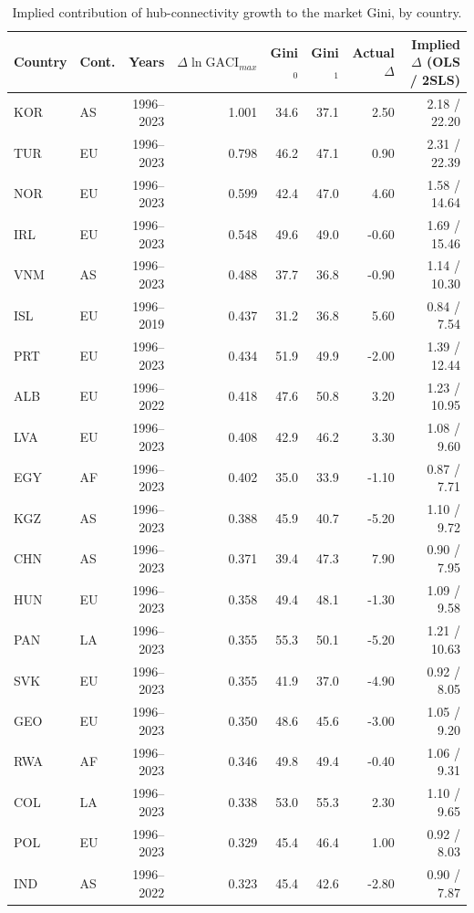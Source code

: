 \begin{table}[H]\centering\caption{Implied contribution of hub-connectivity growth to the market Gini, by country.}\label{tab:a_country}
\begin{threeparttable}\scriptsize\begin{tabular}{llrrrrrr}
\toprule
Country & Cont. & Years & $\Delta\ln\mathrm{GACI}_{max}$ & Gini$_0$ & Gini$_1$ & Actual $\Delta$ & Implied $\Delta$ (OLS / 2SLS) \\
\midrule
KOR & AS & 1996--2023 & 1.001 & 34.6 & 37.1 & 2.50 & 2.18 / 22.20 \\
TUR & EU & 1996--2023 & 0.798 & 46.2 & 47.1 & 0.90 & 2.31 / 22.39 \\
NOR & EU & 1996--2023 & 0.599 & 42.4 & 47.0 & 4.60 & 1.58 / 14.64 \\
IRL & EU & 1996--2023 & 0.548 & 49.6 & 49.0 & -0.60 & 1.69 / 15.46 \\
VNM & AS & 1996--2023 & 0.488 & 37.7 & 36.8 & -0.90 & 1.14 / 10.30 \\
ISL & EU & 1996--2019 & 0.437 & 31.2 & 36.8 & 5.60 & 0.84 / 7.54 \\
PRT & EU & 1996--2023 & 0.434 & 51.9 & 49.9 & -2.00 & 1.39 / 12.44 \\
ALB & EU & 1996--2022 & 0.418 & 47.6 & 50.8 & 3.20 & 1.23 / 10.95 \\
LVA & EU & 1996--2023 & 0.408 & 42.9 & 46.2 & 3.30 & 1.08 / 9.60 \\
EGY & AF & 1996--2023 & 0.402 & 35.0 & 33.9 & -1.10 & 0.87 / 7.71 \\
KGZ & AS & 1996--2023 & 0.388 & 45.9 & 40.7 & -5.20 & 1.10 / 9.72 \\
CHN & AS & 1996--2023 & 0.371 & 39.4 & 47.3 & 7.90 & 0.90 / 7.95 \\
HUN & EU & 1996--2023 & 0.358 & 49.4 & 48.1 & -1.30 & 1.09 / 9.58 \\
PAN & LA & 1996--2023 & 0.355 & 55.3 & 50.1 & -5.20 & 1.21 / 10.63 \\
SVK & EU & 1996--2023 & 0.355 & 41.9 & 37.0 & -4.90 & 0.92 / 8.05 \\
GEO & EU & 1996--2023 & 0.350 & 48.6 & 45.6 & -3.00 & 1.05 / 9.20 \\
RWA & AF & 1996--2023 & 0.346 & 49.8 & 49.4 & -0.40 & 1.06 / 9.31 \\
COL & LA & 1996--2023 & 0.338 & 53.0 & 55.3 & 2.30 & 1.10 / 9.65 \\
POL & EU & 1996--2023 & 0.329 & 45.4 & 46.4 & 1.00 & 0.92 / 8.03 \\
IND & AS & 1996--2022 & 0.323 & 45.4 & 42.6 & -2.80 & 0.90 / 7.87 \\

\end{tabular}
\end{threeparttable}
\end{table}
